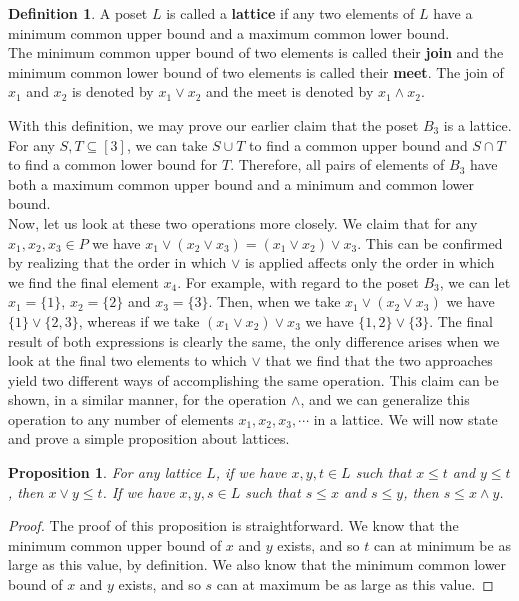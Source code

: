 \documentclass{article} %
\theoremstyle{definition}
\newtheorem{definition}{Definition}[section]
\theoremstyle{plain}
\newtheorem{prop}[thm]{Proposition}
\begin{document}
\begin{definition} A poset $L$ is called a \textbf{lattice} if any two elements of $L$ have a minimum common upper bound and a maximum common lower bound. \\

The minimum common upper bound of two elements is called their \textbf{join} and the minimum common lower bound of two elements is called their \textbf{meet}. The join of $x_{1}$ and $x_{2}$ is denoted by $x_{1} \vee x_{2}$ and the meet is denoted by $x_{1} \wedge x_{2}$.
\end{definition}



With this definition, we may prove our earlier claim that the poset $B_{3}$ is a lattice. For any $S,T \subseteq [3]$, we can take $S \cup T$ to find a common upper bound and $S \cap T$ to find a common lower bound for $T$. Therefore, all pairs of elements of $B_3$ have both a maximum common upper bound and a minimum and common lower bound.\\ 

Now, let us look at these two operations more closely. We claim that for any $x_1,x_2,x_3 \in P$ we have $x_{1} \vee (x_{2} \vee x_{3})=(x_{1} \vee x_{2}) \vee x_{3}$. This can be confirmed by realizing that the order in which $\vee$ is applied affects only the order in which we find the final element $x_{4}$. For example, with regard to the poset $B_{3}$, we can let $x_{1}=\{1\}$, $x_{2}=\{2\}$ and $x_{3}=\{3\}$. Then, when we take $x_{1} \vee (x_{2} \vee x_{3})$ we have $\{1\} \vee \{2,3\}$, whereas if we take $(x_{1} \vee x_{2}) \vee x_{3}$ we have $\{1,2\} \vee \{3\}$. The final result of both expressions is clearly the same, the only difference arises when we look at the final two elements to which $\vee$ that we find that the two approaches yield two different ways of accomplishing the same operation. This claim can be shown, in a similar manner, for the operation $\wedge$, and we can generalize this operation to any number of elements $x_{1}, x_{2}, x_{3}, \dotsm$ in a lattice. We will now state and prove a simple proposition about lattices. \\

\begin{prop}
For any lattice $L$, if we have $x, y, t \in L$ such that $x \leq t$ and $y \leq t$, then $x \vee y \leq t$. If we have $x, y, s \in L$ such that $s \leq x$ and $s \leq y$, then $s \leq x \wedge y$.
\end{prop}
\begin{proof}
The proof of this proposition is straightforward. We know that the minimum common upper bound of $x$ and $y$ exists, and so $t$ can at minimum be as large as this value, by definition. We also know that the minimum common lower bound of $x$ and $y$ exists, and so $s$ can at maximum be as large as this value.
\end{proof} 
\end{document}
